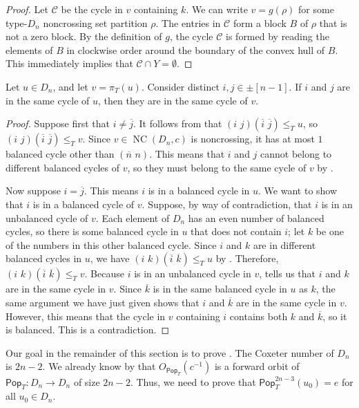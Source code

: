 \documentclass[ALCO,ThmDefs,Unicode,epreuves]{cedram}
\newcommand{\pop}{\mathsf{Pop}}
\DeclareMathOperator{\NC}{NC}
\begin{document}
\begin{proof}
Let $\mathcal C$ be the cycle in $v$ containing $k$. We can write $v=g(\rho)$ for some type-$D_n$ noncrossing set partition $\rho$. The entries in $\mathcal C$ form a block $B$ of $\rho$ that is not a zero block. By the definition of $g$, the cycle $\mathcal C$ is formed by reading the elements of $B$ in clockwise order around the boundary of the convex hull of $B$. This immediately implies that $\mathcal C\cap Y=\emptyset$.  
\end{proof}

\begin{lemma}\label{Lem2}
Let $u\in D_n$, and let $v=\pi_T(u)$. Consider distinct $i,j\in\pm[n-1]$. If $i$ and $j$ are in the same cycle of $u$, then they are in the same cycle of $v$.   
\end{lemma}

\begin{proof}
Suppose first that $i\neq \overline j$. It follows from  that $(i\,\,j)(\overline i\,\,\overline j)\leq_T u$, so $(i\,\,j)(\overline i\,\,\overline j)\leq_T v$. Since $v\in\NC(D_n,c)$ is noncrossing, it has at most $1$ balanced cycle other than $(\overline n\,\,n)$. This means that $i$ and $j$ cannot belong to different balanced cycles of $v$, so they must belong to the same cycle of $v$ by . 

Now suppose $i=\overline j$. This means $i$ is in a balanced cycle in $u$. We want to show that $i$ is in a balanced cycle of $v$. Suppose, by way of contradiction, that $i$ is in an unbalanced cycle of $v$. Each element of $D_n$ has an even number of balanced cycles, so there is some balanced cycle in $u$ that does not contain $i$; let $k$ be one of the numbers in this other balanced cycle. Since $i$ and $k$ are in different balanced cycles in $u$, we have $(i\,\,k)(\overline i\,\,\overline k)\leq_T u$ by . Therefore, $(i\,\,k)(\overline i\,\,\overline k)\leq_T v$. Because $i$ is in an unbalanced cycle in $v$,  tells us that $i$ and $k$ are in the same cycle in $v$. Since $\overline k$ is in the same balanced cycle in $u$ as $k$, the same argument we have just given shows that $i$ and $\overline k$ are in the same cycle in $v$. However, this means that the cycle in $v$ containing $i$ contains both $k$ and $\overline k$, so it is balanced. This is a contradiction.     
\end{proof}

Our goal in the remainder of this section is to prove . The Coxeter number of $D_n$ is $2n{-}2$. We already know by  that $O_{\pop_T}(c^{-1})$ is a forward orbit of $\pop_T:D_n\to D_n$ of size $2n{-}2$. Thus, we need to prove that $\pop_T^{2n-3}(u_0)=e$ for all $u_0\in D_n$. 
\end{document}
